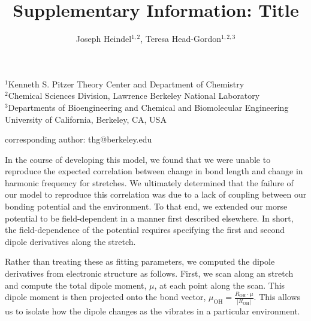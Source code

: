 \documentclass[12pt,letter]{article}
\begin{document}
\title{Supplementary Information: Title}
\author{Joseph Heindel$^{1,2}$, Teresa Head-Gordon$^{1,2,3}$}
\date{\vspace{-10ex}}
\maketitle
\noindent
\begin{center}
$^1$Kenneth S. Pitzer Theory Center and Department of Chemistry\\
$^2$Chemical Sciences Division, Lawrence Berkeley National Laboratory\\
$^3$Departments of Bioengineering and Chemical and Biomolecular Engineering\\
University of California, Berkeley, CA, USA


corresponding author: thg@berkeley.edu
\end{center}

\newpage

In the course of developing this model, we found that we were unable to reproduce the
expected correlation between change in bond length and change in harmonic frequency
for  stretches.\cite{boyer2019beyond} We ultimately determined that the failure
of our model to reproduce this correlation was due to a lack of coupling between
our bonding potential and the environment. To that end, we extended our morse potential
to be field-dependent in a manner first described elsewhere.\cite{boyer2019beyond} In short,
the field-dependence of the potential requires specifying the first and second dipole
derivatives along the  stretch.

Rather than treating these as fitting parameters, we computed the dipole derivatives
from electronic structure as follows. First, we scan along an  stretch
and compute the total dipole moment, $\mu$, at each point along the scan. This dipole
moment is then projected onto the  bond vector,
$\mu_{\mathrm{OH}}=\frac{R_{\mathrm{OH}}\cdot \mu}{|R_{\mathrm{OH}}|}$. This allows
us to isolate how the dipole changes as the  vibrates in a particular environment.
\end{document}
